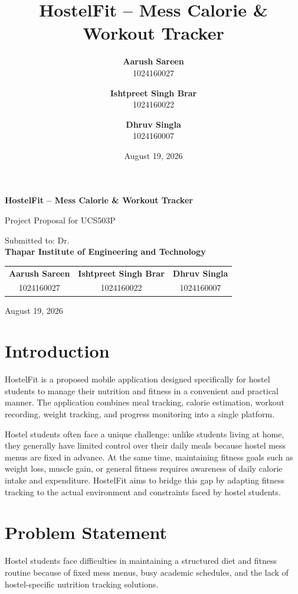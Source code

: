 \documentclass[11pt,a4paper]{article}
\title{\textbf{HostelFit -- Mess Calorie \& Workout Tracker}}
\author{
\textbf{Aarush Sareen}\\
1024160027
\and
\textbf{Ishtpreet Singh Brar}\\
1024160022
\and
\textbf{Dhruv Singla}\\
1024160007
}
\date{August 19, 2026}
\begin{document}
\begin{center}
{\LARGE \textbf{HostelFit -- Mess Calorie \& Workout Tracker}\par}
\vspace{0.15cm}
{\large Project Proposal for UCS503P\par}
\vspace{0.15cm}
Submitted to: Dr. \\
\textbf{Thapar Institute of Engineering and Technology}
\vspace{0.20cm}

\begin{tabular}{ccc}
\textbf{Aarush Sareen} &
\textbf{Ishtpreet Singh Brar} &
\textbf{Dhruv Singla} \\[2pt]
1024160027 & 1024160022 & 1024160007
\end{tabular}

\vspace{0.12cm}

August 19, 2026
\end{center}


\section{Introduction}

HostelFit is a proposed mobile application designed specifically for hostel students to manage their nutrition and fitness in a convenient and practical manner. The application combines meal tracking, calorie estimation, workout recording, weight tracking, and progress monitoring into a single platform.

Hostel students often face a unique challenge: unlike students living at home, they generally have limited control over their daily meals because hostel mess menus are fixed in advance. At the same time, maintaining fitness goals such as weight loss, muscle gain, or general fitness requires awareness of daily calorie intake and expenditure. HostelFit aims to bridge this gap by adapting fitness tracking to the actual environment and constraints faced by hostel students.

\section{Problem Statement}

Hostel students face difficulties in maintaining a structured diet and fitness routine because of fixed mess menus, busy academic schedules, and the lack of hostel-specific nutrition tracking solutions.
\end{document}
